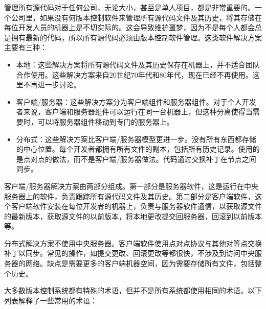 管理所有源代码对于任何公司，无论大小，甚至是单人项目，都是非常重要的。一个公司里，如果没有何版本控制软件来管理所有源代码文件及其历史，将其存储在每位开发人员的机器上是不切实际的。这会导致维护噩梦，因为不是每个人都会总是拥有最新的代码，所以所有源代码必须由版本控制软件管理。这类软件解决方案主要有三种：

\begin{itemize}
\item
本地：这些解决方案将所有源代码文件及其历史保存在机器上，并不适合团队合作使用。这些解决方案来自20世纪70年代和80年代，现在已经不再使用。这里不再进一步讨论。

\item
客户端/服务器：这些解决方案分为客户端组件和服务器组件。对于个人开发者来说，客户端和服务器组件可以运行在同一台机器上，但这种分离使得当需要时，可以将服务器组件移动到专门的服务器上。

\item
分布式：这些解决方案比客户端/服务器模型更进一步。没有所有东西都存储的中心位置。每个开发者都拥有所有文件的副本，包括所有历史记录。使用的是点对点的做法，而不是客户端/服务器做法。代码通过交换补丁在节点之间同步。
\end{itemize}

客户端/服务器解决方案由两部分组成。第一部分是服务器软件，这是运行在中央服务器上的软件，负责跟踪所有源代码文件及其历史。第二部分是客户端软件，这个客户端软件安装在每位开发者的机器上，负责与服务器软件通信，以获取源文件的最新版本，获取源文件的以前版本，将本地更改提交回服务器，回滚到以前版本等。

分布式解决方案不使用中央服务器。客户端软件使用点对点协议与其他对等点交换补丁以同步。常见的操作，如提交更改、回滚更改等都很快，不涉及到访问中央服务器的网络。缺点是需要更多的客户端机器空间，因为需要存储所有文件，包括整个历史。

大多数版本控制系统都有特殊的术语，但并不是所有系统都使用相同的术语。以下列表解释了一些常用的术语：

